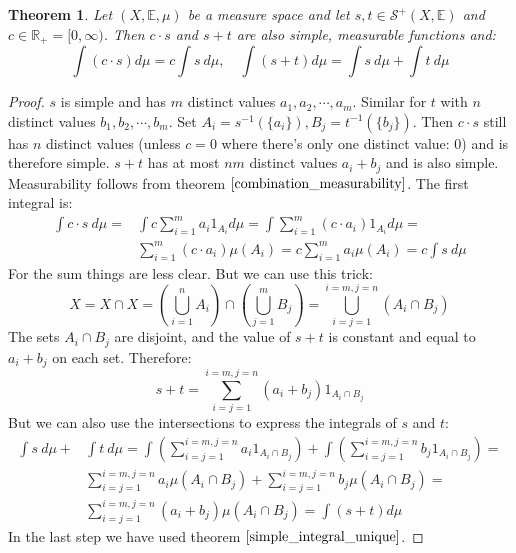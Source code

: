 \documentclass[12pt, a4paper]{article}
\newtheorem{theorem}{Theorem}[section]
\numberwithin{equation}{section}
\begin{document}
\begin{theorem}
\label{simple_integral_linear}
Let $(X,\mathbb{E},\mu)$ be a measure space and let $s, t\in\mathcal{S}^+(X,\mathbb{E})$ and $c\in\mathbb{R}_+=[0,\infty)$. Then $c\cdot s$ and $s+t$ are also simple, measurable functions and:
\begin{equation}
\int(c\cdot s)d\mu=c\int s\ d\mu,\quad \int(s+t)d\mu=\int s\ d\mu+\int t\ d\mu
\end{equation}
\end{theorem}
\begin{proof}
$s$ is simple and has $m$ distinct values $a_1,a_2,\cdots,a_m$. Similar for $t$ with $n$ distinct values $b_1,b_2,\cdots,b_m$. Set $A_i=s^{-1}(\{a_i\}), B_j=t^{-1}(\{b_j\})$. Then $c\cdot s$ still has $n$ distinct values (unless $c=0$ where there's only one distinct value: 0) and is therefore simple. $s+t$ has at most $nm$ distinct values $a_i+b_j$ and is also simple. Measurability follows from theorem $\ref{combination_measurability}$. The first integral is:
\begin{align}
\int c\cdot s\ d\mu=&\int c\sum_{i=1}^m a_i 1_{A_i}d\mu=\int\sum_{i=1}^m (c\cdot a_i) 1_{A_i}d\mu=\\
&\sum_{i=1}^m (c\cdot a_i)\mu(A_i)=c\sum_{i=1}^m a_i\mu(A_i)=c\int s\ d\mu
\end{align}
For the sum things are less clear. But we can use this trick:
\begin{equation}
X=X\cap X=\left(\bigcup_{i=1}^n A_i\right)\cap\left(\bigcup_{j=1}^m B_j\right)=\bigcup_{i=j=1}^{i=m,j=n}\left(A_i\cap B_j\right)
\end{equation}
The sets $A_i\cap B_j$ are disjoint, and the value of $s+t$ is constant and equal to $a_i+b_j$ on each set. Therefore:
\begin{equation}
s+t=\sum_{i=j=1}^{i=m,j=n}(a_i+b_j)1_{A_i\cap B_j}
\end{equation}
But we can also use the intersections to express the integrals of $s$ and $t$:
\begin{align}
\int s\ d\mu+&\int t\ d\mu=\int\left(\sum_{i=j=1}^{i=m,j=n}a_i 1_{A_i\cap B_j}\right)+\int\left(\sum_{i=j=1}^{i=m,j=n}b_j 1_{A_i\cap B_j}\right)=\\
&\sum_{i=j=1}^{i=m,j=n}a_i\mu(A_i\cap B_j)+\sum_{i=j=1}^{i=m,j=n}b_j\mu(A_i\cap B_j)=\\
&\sum_{i=j=1}^{i=m,j=n}(a_i+b_j)\mu(A_i\cap B_j)=\int(s+t)d\mu
\end{align}
In the last step we have used theorem $\ref{simple_integral_unique}$.
\end{proof}
\end{document}
